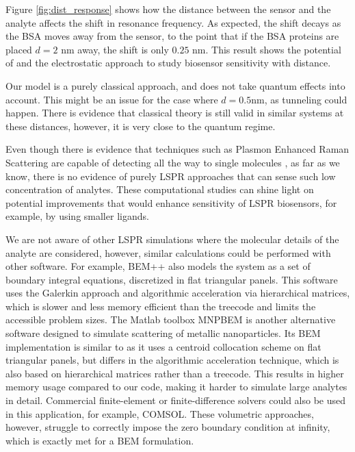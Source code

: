 Figure \ref{fig:dist_response} shows how the distance between the sensor 
and the analyte affects the shift in resonance frequency. As expected, the shift decays 
as the BSA moves away from the sensor, to the point that if the BSA proteins are placed
$d=2$ nm away, the shift is only $0.25$ nm. This result shows the potential of \pygbe 
and the electrostatic approach to study biosensor sensitivity with distance.

Our model is a purely classical approach, and does not take quantum effects into account.  
This might be an issue for the case where $d=0.5$nm, as tunneling could happen.
There is evidence that classical theory is still valid in similar systems
\cite{SavageETal2012, EstebanETal2012} at these distances, however, it is very close to 
the quantum regime.  

Even though there is evidence that techniques such as Plasmon Enhanced Raman Scattering are capable of detecting all the way to single molecules \cite{ZhangZhangETal2013}, 
as far as we know, there is no evidence of purely LSPR approaches that can sense such low concentration of analytes.
These computational studies can shine light on
potential improvements that would enhance sensitivity of LSPR biosensors, for example, by using
smaller ligands. 

We are not aware of other LSPR simulations where the molecular details of the analyte are considered, however, similar calculations could be performed with other software. 
For example, BEM++ \cite{SmigajETal2015} also models the system as a set of boundary integral equations, discretized in flat triangular panels. 
This software uses the Galerkin approach and algorithmic acceleration via hierarchical matrices, which is slower and less memory efficient than the treecode and limits the accessible problem sizes.
The Matlab toolbox MNPBEM \cite{HohenesterTrugler2012} is another alternative software designed to simulate scattering of metallic nanoparticles.
Its BEM implementation is similar to \pygbe as it uses a centroid collocation scheme on flat triangular panels, but differs in the algorithmic acceleration technique, which is also based on hierarchical matrices rather than a treecode. 
This results in higher memory usage compared to our code, making it harder to simulate large analytes in detail.
Commercial finite-element or finite-difference solvers could also be used in this application, for example, COMSOL. 
These volumetric approaches, however, struggle to correctly impose the zero boundary condition at infinity, which is exactly met for a BEM formulation.
